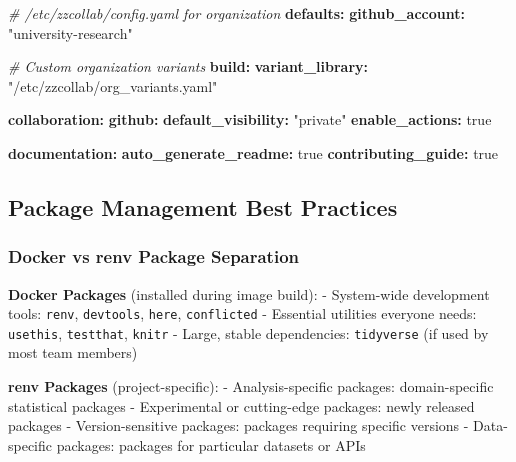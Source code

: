 \documentclass[
]{article}
\newenvironment{Shaded}{\begin{snugshade}}{\end{snugshade}}
\newcommand{\AttributeTok}[1]{\textcolor[rgb]{0.13,0.29,0.53}{#1}}
\newcommand{\CharTok}[1]{\textcolor[rgb]{0.31,0.60,0.02}{#1}}
\newcommand{\CommentTok}[1]{\textcolor[rgb]{0.56,0.35,0.01}{\textit{#1}}}
\newcommand{\FunctionTok}[1]{\textcolor[rgb]{0.13,0.29,0.53}{\textbf{#1}}}
\newcommand{\KeywordTok}[1]{\textcolor[rgb]{0.13,0.29,0.53}{\textbf{#1}}}
\newcommand{\StringTok}[1]{\textcolor[rgb]{0.31,0.60,0.02}{#1}}
\begin{document}
\begin{Shaded}
\begin{Highlighting}[]
\CommentTok{\# /etc/zzcollab/config.yaml for organization}
\FunctionTok{defaults}\KeywordTok{:}
\AttributeTok{  }\FunctionTok{github\_account}\KeywordTok{:}\AttributeTok{ }\StringTok{"university{-}research"}

\CommentTok{\# Custom organization variants}
\FunctionTok{build}\KeywordTok{:}
\AttributeTok{  }\FunctionTok{variant\_library}\KeywordTok{:}\AttributeTok{ }\StringTok{"/etc/zzcollab/org\_variants.yaml"}

\FunctionTok{collaboration}\KeywordTok{:}
\AttributeTok{  }\FunctionTok{github}\KeywordTok{:}
\AttributeTok{    }\FunctionTok{default\_visibility}\KeywordTok{:}\AttributeTok{ }\StringTok{"private"}
\AttributeTok{    }\FunctionTok{enable\_actions}\KeywordTok{:}\AttributeTok{ }\CharTok{true}

\AttributeTok{  }\FunctionTok{documentation}\KeywordTok{:}
\AttributeTok{    }\FunctionTok{auto\_generate\_readme}\KeywordTok{:}\AttributeTok{ }\CharTok{true}
\AttributeTok{    }\FunctionTok{contributing\_guide}\KeywordTok{:}\AttributeTok{ }\CharTok{true}
\end{Highlighting}
\end{Shaded}

\subsection{Package Management Best
Practices}\label{package-management-best-practices}

\subsubsection{Docker vs renv Package
Separation}\label{docker-vs-renv-package-separation}

\textbf{Docker Packages} (installed during image build): - System-wide
development tools: \texttt{renv}, \texttt{devtools}, \texttt{here},
\texttt{conflicted} - Essential utilities everyone needs:
\texttt{usethis}, \texttt{testthat}, \texttt{knitr} - Large, stable
dependencies: \texttt{tidyverse} (if used by most team members)

\textbf{renv Packages} (project-specific): - Analysis-specific packages:
domain-specific statistical packages - Experimental or cutting-edge
packages: newly released packages - Version-sensitive packages: packages
requiring specific versions - Data-specific packages: packages for
particular datasets or APIs
\end{document}
